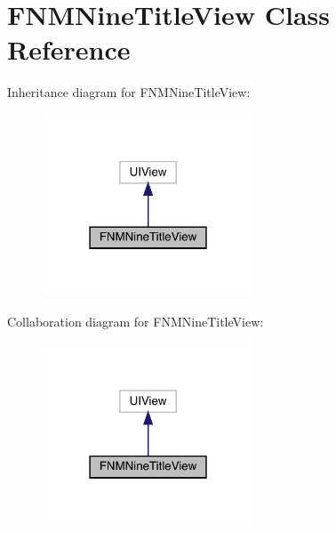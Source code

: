 \hypertarget{interface_f_n_m_nine_title_view}{}\section{F\+N\+M\+Nine\+Title\+View Class Reference}
\label{interface_f_n_m_nine_title_view}


Inheritance diagram for F\+N\+M\+Nine\+Title\+View\+:\nopagebreak
\begin{figure}[H]
\begin{center}
\leavevmode
\includegraphics[width=178pt]{interface_f_n_m_nine_title_view__inherit__graph}
\end{center}
\end{figure}


Collaboration diagram for F\+N\+M\+Nine\+Title\+View\+:\nopagebreak
\begin{figure}[H]
\begin{center}
\leavevmode
\includegraphics[width=178pt]{interface_f_n_m_nine_title_view__coll__graph}
\end{center}
\end{figure}
